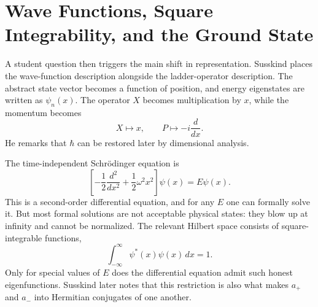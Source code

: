 \section{Wave Functions, Square Integrability, and the Ground State}

A student question then triggers the main shift in representation. Susskind places the wave-function description alongside the ladder-operator description. The abstract state vector becomes a function of position, and energy eigenstates are written as \(\psi_{n}(x)\). The operator \(X\) becomes multiplication by \(x\), while the momentum becomes
\begin{equation}
X\mapsto x,\qquad P\mapsto -i\frac{d}{dx}.
\end{equation}
He remarks that \(\hbar\) can be restored later by dimensional analysis.

The time-independent Schr\"odinger equation is
\begin{equation}
\left[-\frac{1}{2}\frac{d^{2}}{dx^{2}}+\frac{1}{2}\omega^{2}x^{2}\right]\psi(x)=E\psi(x).
\end{equation}
This is a second-order differential equation, and for any \(E\) one can formally solve it. But most formal solutions are not acceptable physical states: they blow up at infinity and cannot be normalized. The relevant Hilbert space consists of square-integrable functions,
\begin{equation}
\int_{-\infty}^{\infty}\psi^{*}(x)\psi(x)\,dx=1.
\end{equation}
Only for special values of \(E\) does the differential equation admit such honest eigenfunctions. Susskind later notes that this restriction is also what makes \(a_{+}\) and \(a_{-}\) into Hermitian conjugates of one another.

